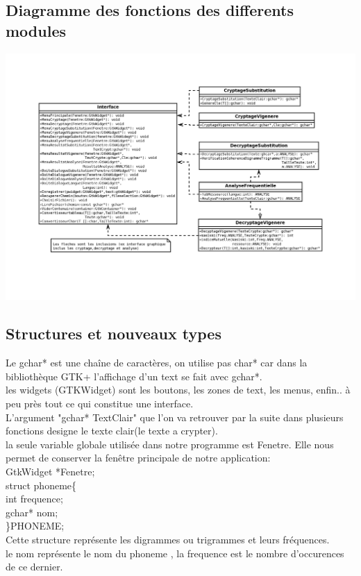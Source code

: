 \documentclass[a4]{article}
\begin{document}
		\subsection{Diagramme des fonctions des differents modules}
		\includegraphics[scale=0.8]{diaa.jpg}
		\subsection{Structures et nouveaux types}
		Le gchar* est une chaîne de caractères, on utilise pas char* car dans la bibliothèque
		GTK+ l'affichage d'un text se fait avec gchar*.\\
		
		les widgets (GTKWidget) sont les boutons, les zones de text, les menus, enfin.. à peu 
		près tout ce qui constitue une interface.\\
		
		L'argument "gchar* TextClair" que l'on va retrouver par la suite dans plusieurs fonctions
		designe le texte clair(le texte a crypter).\\
		
		la seule  variable globale utilisée dans notre programme est Fenetre. Elle nous permet de
		conserver la fenêtre principale de notre application:\\
		GtkWidget *Fenetre; \\
		
	struct phoneme\{\\
		int frequence;\\
		gchar* nom;\\
	\}PHONEME;\\
	Cette structure représente les digrammes ou trigrammes et leurs fréquences.\\
	le nom représente le nom du phoneme , la frequence est le nombre d'occurences\\
	de ce dernier.\\
	
\end{document}

